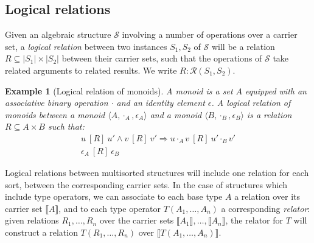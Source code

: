 \documentclass{article}
\newtheorem{example}{Example}
\newcommand{\ifr}[1]{\ [{#1}]\ }
\begin{document}
\subsection{Logical relations}

Given an algebraic structure $\mathcal{S}$
involving a number of operations over a carrier set,
a \emph{logical relation}
between two instances $S_1, S_2$ of $\mathcal{S}$
will be a relation $R \subseteq |S_1| \times |S_2|$
between their carrier sets,
such that the operations of $\mathcal{S}$
take related arguments to related results.
We write $R : \mathcal{R}(S_1, S_2)$.

\begin{example}[Logical relation of monoids]
\label{ex:monoid}
A \emph{monoid} is a set $A$ equipped with
an associative binary operation $\cdot$ and
an identity element $\epsilon$.
A \emph{logical relation of monoids} between
a monoid $\langle A, \cdot_A, \epsilon_A \rangle$ and
a monoid $\langle B, \cdot_B, \epsilon_B \rangle$
is a relation $R \subseteq A \times B$
such that:
\begin{gather*}
u \ifr{R} u' \wedge v \ifr{R} v' \Rightarrow u \cdot_A v \ifr{R} u' \cdot_B v' \\
\epsilon_A \ifr{R} \epsilon_B
\end{gather*}
\end{example}

Logical relations between multisorted structures
will include one relation for each sort,
between the corresponding carrier sets.
In the case of structures which include type operators,
we can associate to each base type $A$
a relation over its carrier set $\llbracket A \rrbracket$,
and to each type operator $T(A_1, \ldots, A_n)$
a corresponding \emph{relator}:
given relations $R_1, \ldots, R_n$ over
the carrier sets $\llbracket A_1 \rrbracket, \ldots, \llbracket A_n \rrbracket$,
the relator for $T$
will construct a relation $T(R_1, \ldots, R_n)$
over $\llbracket T(A_1, \ldots, A_n) \rrbracket$.
\end{document}
